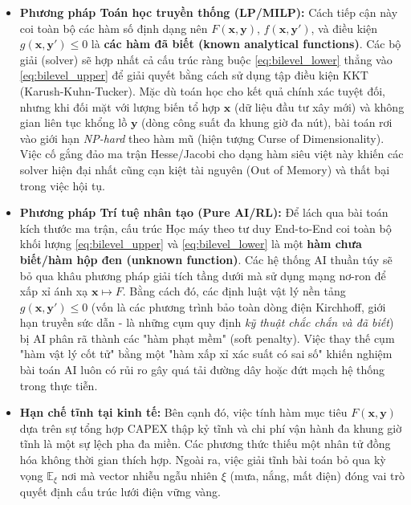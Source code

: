\begin{itemize}
    \item \textbf{Phương pháp Toán học truyền thống (LP/MILP):} 
    Cách tiếp cận này coi toàn bộ các hàm số định dạng nên $F(\mathbf{x}, \mathbf{y})$, $f(\mathbf{x}, \mathbf{y}')$, và điều kiện $g(\mathbf{x}, \mathbf{y}') \leq 0$ là \textbf{các hàm đã biết (known analytical functions)}. Các bộ giải (solver) sẽ hợp nhất cả cấu trúc ràng buộc \eqref{eq:bilevel_lower} thẳng vào \eqref{eq:bilevel_upper} để giải quyết bằng cách sử dụng tập điều kiện KKT (Karush-Kuhn-Tucker). Mặc dù toán học cho kết quả chính xác tuyệt đối, nhưng khi đối mặt với lượng biến tổ hợp $\mathbf{x}$ (dữ liệu đầu tư xây mới) và không gian liên tục khổng lồ $\mathbf{y}$ (dòng công suất đa khung giờ đa nút), bài toán rơi vào giới hạn \textit{NP-hard} theo hàm mũ (hiện tượng Curse of Dimensionality). Việc cố gắng đảo ma trận Hesse/Jacobi cho dạng hàm siêu việt này khiến các solver hiện đại nhất cũng cạn kiệt tài nguyên (Out of Memory) và thất bại trong việc hội tụ.
    
    \item \textbf{Phương pháp Trí tuệ nhân tạo (Pure AI/RL):} 
    Để lách qua bài toán kích thước ma trận, cấu trúc Học máy theo tư duy End-to-End coi toàn bộ khối lượng \eqref{eq:bilevel_upper} và \eqref{eq:bilevel_lower} là một \textbf{hàm chưa biết/hàm hộp đen (unknown function)}. Các hệ thống AI thuần túy sẽ bỏ qua khâu phương pháp giải tích tầng dưới mà sử dụng mạng nơ-ron để xấp xỉ ánh xạ $\mathbf{x} \mapsto F$. Bằng cách đó, các định luật vật lý nền tảng $g(\mathbf{x}, \mathbf{y}') \leq 0$ (vốn là các phương trình bảo toàn dòng điện Kirchhoff, giới hạn truyền sức dẫn - là những cụm quy định \textit{kỹ thuật chắc chắn và đã biết}) bị AI phân rã thành các "hàm phạt mềm" (soft penalty). Việc thay thế cụm "hàm vật lý cốt tử" bằng một "hàm xấp xỉ xác suất có sai số" khiến nghiệm bài toán AI luôn có rủi ro gây quá tải đường dây hoặc đứt mạch hệ thống trong thực tiễn.
    
    \item \textbf{Hạn chế tĩnh tại kinh tế:}
    Bên cạnh đó, việc tính hàm mục tiêu $F(\mathbf{x}, \mathbf{y})$ dựa trên sự tổng hợp CAPEX thập kỷ tĩnh và chi phí vận hành đa khung giờ tĩnh là một sự lệch pha đa miền. Các phương thức thiếu một nhân tử đồng hóa không thời gian thích hợp. Ngoài ra, việc giải tĩnh bài toán bỏ qua kỳ vọng $\mathbb{E}_\xi$ nơi mà vector nhiễu ngẫu nhiên $\xi$ (mưa, nắng, mất điện) đóng vai trò quyết định cấu trúc lưới điện vững vàng.
\end{itemize}

